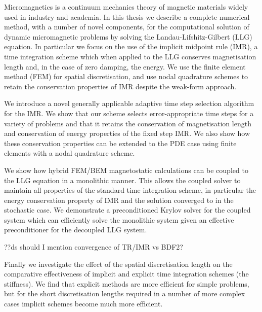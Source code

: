 
Micromagnetics is a continuum mechanics theory of magnetic materials widely used in industry and academia.
In this thesis we describe a complete numerical method, with a number of novel components, for the computational solution of dynamic micromagnetic problems by solving the Landau-Lifshitz-Gilbert  (LLG) equation.
In particular we focus on the use of the implicit midpoint rule (IMR), a time integration scheme which when applied to the LLG conserves magnetisation length and, in the case of zero damping, the energy.
We use the finite element method (FEM) for spatial discretisation, and use nodal quadrature schemes to retain the conservation properties of IMR despite the weak-form approach.

We introduce a novel generally applicable adaptive time step selection algorithm for the IMR.
We show that our scheme selects error-appropriate time steps for a variety of problems and that it retains the conservation of magnetisation length and conservation of energy properties of the fixed step IMR.
We also show how these conservation properties can be extended to the PDE case using finite elements with a nodal quadrature scheme.

We show how hybrid FEM/BEM magnetostatic calculations can be coupled to the LLG equation in a monolithic manner.
This allows the coupled solver to maintain all properties of the standard time integration scheme, in particular the energy conservation property of IMR and the solution converged to in the stochastic case.
We demonstrate a preconditioned Krylov solver for the coupled system which can efficiently solve the monolithic system given an effective preconditioner for the decoupled LLG system.

??ds should I mention convergence of TR/IMR vs BDF2?

Finally we investigate the effect of the spatial discretisation length on the comparative effectiveness of implicit and explicit time integration schemes (\ie the stiffness).
We find that explicit methods are more efficient for simple problems, but for the short discretisation lengths required in a number of more complex cases implicit schemes become much more efficient.


